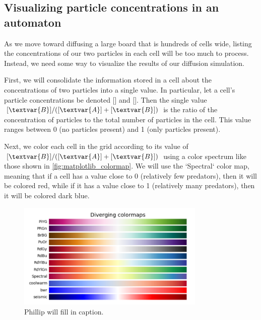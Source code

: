 \begin{qbox}[%
Update the cells in \autoref{fig:two_particle_concentration_diffusion} after another generation of diffusion. Use the diffusion rates $d_A = 0.2$ and $d_B = 0.1$.
]\end{qbox}

\FloatBarrier
{}
\subsection{Visualizing particle concentrations in an automaton}

As we move toward diffusing a large board that is hundreds of cells wide, listing the concentrations of our two particles in each cell will be too much to process. Instead, we need some way to visualize the results of our diffusion simulation.

First, we will consolidate the information stored in a cell about the concentrations of two particles into a single value. In particular, let a cell's particle concentrations be denoted [] and []. Then the single value $[\textvar{B}]/([\textvar{A}] + [\textvar{B}])$ is the ratio of the concentration of  particles to the total number of particles in the cell. This value ranges between 0 (no  particles present) and 1 (only  particles present).

Next, we color each cell in the grid according to its value of $[\textvar{B}]/([\textvar{A}] + [\textvar{B}])$ using a color spectrum like those shown in \autoref{fig:matplotlib_colormap}. We will use the `Spectral` color map, meaning that if a cell has a value close to 0 (relatively few predators), then it will be colored red, while if it has a value close to 1 (relatively many predators), then it will be colored dark blue.\\

\begin{figure}[h]
\centering
\mySfFamily
\includegraphics[width = 0.8\textwidth]{../images/matplotlib_colormap.png}
\caption{Phillip will fill in caption.}
\label{fig:matplotlib_colormap}
\end{figure}

